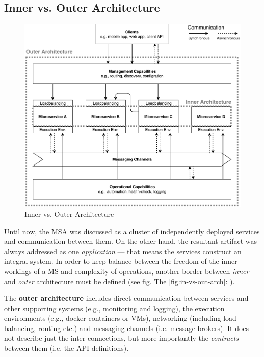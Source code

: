 \documentclass[thesis=M,english,hidelinks]{FITthesis}[2012/10/20]
\newcommand*{\fullref}[1]{\hyperref[{#1}]{\autoref*{#1}: \textit{\nameref*{#1}}}}
\begin{document}
\subsection{Inner vs. Outer Architecture}

\begin{figure}
  \centering
    \includegraphics[width=1\textwidth]{images/architecture_inner_vs_outer.pdf}
    \caption{Inner vs. Outer Architecture}
  \label{fig:in-vs-out-arch}
\end{figure}

Until now, the \acrshort{MSA} was discussed as a cluster of independently deployed services and communication between them. On the other hand, the resultant artifact was always addressed as one \textit{application} --- that means the services construct an integral system. In order to keep balance between the freedom of the inner workings of a \acrshort{MS} and complexity of operations, another border between \textit{inner} and \textit{outer} architecture must be defined (see fig. The \fullref{fig:in-vs-out-arch}).

The \textbf{outer architecture} includes direct communication between services and other supporting systems (e.g., monitoring and logging), the execution environments (e.g., docker containers or \acrshort{VM}s), networking (including load-balancing, routing etc.) and messaging channels (i.e. message brokers). It does not describe just the inter-connections, but more importantly the \textit{contracts} between them (i.e. the \acrshort{API} definitions). 
\end{document}
